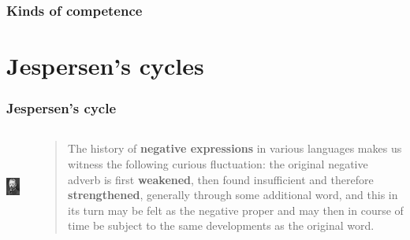 \documentclass[compress]{beamer}
\begin{document}
\begin{frame}
  \frametitle{Kinds of competence}
  \begin{center}
  \end{center}
\end{frame}


\section{Jespersen's cycles}

\begin{frame}
\frametitle{Jespersen's cycle}
\begin{columns}[T]  
   \begin{column}{.2\textwidth}
  	  \vspace{20pt}
	  \includegraphics[height=1.2in]{jespersen.jpg}   
   \end{column}
   \begin{column}{.75\textwidth}
      \begin{block}{}
      \begin{quote}
      The history of \textbf{negative expressions} in various languages makes us witness the following curious fluctuation: the original negative adverb is first \textbf{weakened}, then found insufficient and therefore \textbf{strengthened}, generally through some additional word, and this in its turn may be felt as the negative proper and may then in course of time be subject to the same developments as the original word.
      \end{quote}
	\end{block}
    \end{column}
  \end{columns}
 \vfill\hfill \citep{jespersen:1917}
\end{frame}
\end{document}
